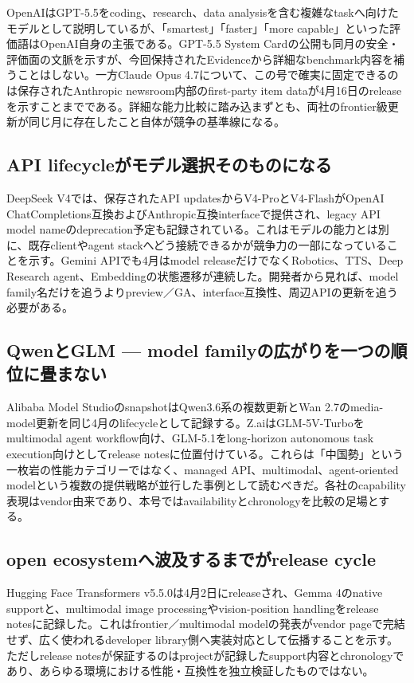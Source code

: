 OpenAIはGPT-5.5をcoding、research、data analysisを含む複雑なtaskへ向けたモデルとして説明しているが、「smartest」「faster」「more capable」といった評価語はOpenAI自身の主張である。GPT-5.5 System Cardの公開も同月の安全・評価面の文脈を示すが、今回保持されたEvidenceから詳細なbenchmark内容を補うことはしない。一方Claude Opus 4.7について、この号で確実に固定できるのは保存されたAnthropic newsroom内部のfirst-party item dataが4月16日のreleaseを示すことまでである。詳細な能力比較に踏み込まずとも、両社のfrontier級更新が同じ月に存在したこと自体が競争の基準線になる。\autocite{src-a07eb39dec04,src-dfe7e0c6ff39,src-f6aa679babd7}


\subsection{API lifecycleがモデル選択そのものになる}

DeepSeek V4では、保存されたAPI updatesからV4-ProとV4-FlashがOpenAI ChatCompletions互換およびAnthropic互換interfaceで提供され、legacy API model nameのdeprecation予定も記録されている。これはモデルの能力とは別に、既存clientやagent stackへどう接続できるかが競争力の一部になっていることを示す。Gemini APIでも4月はmodel releaseだけでなくRobotics、TTS、Deep Research agent、Embeddingの状態遷移が連続した。開発者から見れば、model family名だけを追うよりpreview／GA、interface互換性、周辺APIの更新を追う必要がある。\autocite{src-a24fd97eb3d0,src-e547d0d8cbe3}


\subsection{QwenとGLM — model familyの広がりを一つの順位に畳まない}

Alibaba Model StudioのsnapshotはQwen3.6系の複数更新とWan 2.7のmedia-model更新を同じ4月のlifecycleとして記録する。Z.aiはGLM-5V-Turboをmultimodal agent workflow向け、GLM-5.1をlong-horizon autonomous task execution向けとしてrelease notesに位置付けている。これらは「中国勢」という一枚岩の性能カテゴリーではなく、managed API、multimodal、agent-oriented modelという複数の提供戦略が並行した事例として読むべきだ。各社のcapability表現はvendor由来であり、本号ではavailabilityとchronologyを比較の足場とする。\autocite{src-9156c37fb1c2,src-eac8dfbeb78c}


\subsection{open ecosystemへ波及するまでがrelease cycle}

Hugging Face Transformers v5.5.0は4月2日にreleaseされ、Gemma 4のnative supportと、multimodal image processingやvision-position handlingをrelease notesに記録した。これはfrontier／multimodal modelの発表がvendor pageで完結せず、広く使われるdeveloper library側へ実装対応として伝播することを示す。ただしrelease notesが保証するのはprojectが記録したsupport内容とchronologyであり、あらゆる環境における性能・互換性を独立検証したものではない。\autocite{src-6ddeedd7665f}


